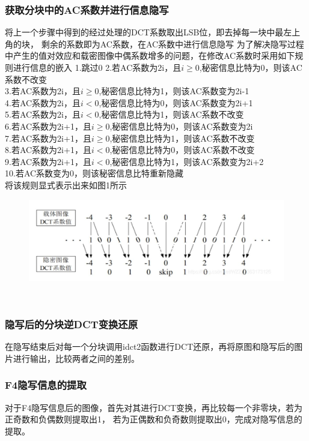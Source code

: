 \documentclass[a4paper,11pt,UTF8]{ctexart}
\newcommand{\bottomcaption}{%
\setlength{\abovecaptionskip}{6pt}%
\setlength{\belowcaptionskip}{6pt}%
\caption}
\newcommand{\xiaowuhao}{\fontsize{9pt}{\baselineskip}\selectfont}   %
\begin{document}
      \subsubsection{获取分块中的AC系数并进行信息隐写}
        将上一个步骤中得到的经过处理的DCT系数取出LSB位，即去掉每一块中最左上角的块，
        剩余的系数即为AC系数，在AC系数中进行信息隐写
        为了解决隐写过程中产生的值对效应和载密图像中偶系数增多的问题，在修改AC系数时采用如下规则进行信息的嵌入
        1.跳过0
        2.若AC系数为2i，且$i\ge 0$,秘密信息比特为0，则该AC系数不改变\\
        3.若AC系数为2i，且$i\ge 0$,秘密信息比特为1，则该AC系数变为2i-1\\
        4.若AC系数为2i，且$i< 0$,秘密信息比特为0，则该AC系数变为2i+1\\
        5.若AC系数为2i，且$i<0$,秘密信息比特为1，则该AC系数不改变\\
        6.若AC系数为2i+1，且$i\ge 0$,秘密信息比特为0，则该AC系数变为2i\\
        7.若AC系数为2i+1，且$i\ge 0$,秘密信息比特为1，则该AC系数不改变\\
        8.若AC系数为2i+1，且$i< 0$,秘密信息比特为0，则该AC系数不改变\\
        9.若AC系数为2i+1，且$i< 0$,秘密信息比特为1，则该AC系数变为2i+2\\
        10.若AC系数变为0，则该秘密信息比特重新隐藏\\
        将该规则显式表示出来如图1所示
        \begin{figure}[!htbp]
          \centering
          \includegraphics[width=\textwidth]{F4.jpg}
          \bottomcaption{\xiaowuhao{F4隐写规则}}
        \end{figure}\\
      \subsubsection{隐写后的分块逆DCT变换还原}
        在隐写结束后对每一个分块调用idct2函数进行DCT还原，再将原图和隐写后的图片进行输出，比较两者之间的差别。
      \subsubsection{F4隐写信息的提取}
        对于F4隐写信息后的图像，首先对其进行DCT变换，再比较每一个非零块，若为正奇数和负偶数则提取出1，
        若为正偶数和负奇数则提取出0，完成对隐写信息的提取。
\end{document}

